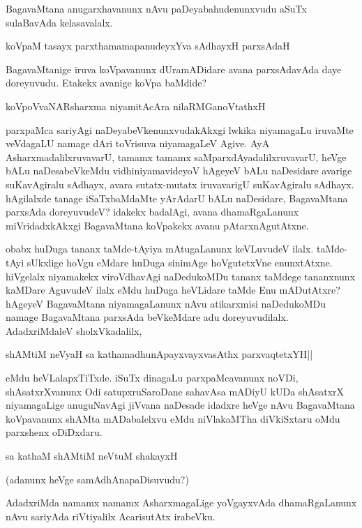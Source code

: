 BagavaMtana anugarxhavanunx nAvu paDeyabahudenunxvudu aSuTx sulaBavAda kelasavalalx.

\begin{shloka}
koVpaM tasayx parxthamamapanudeyxYva sAdhayxH parxsAdaH
\end{shloka}

BagavaMtanige iruva koVpavanunx dUramADidare avana parxsAdavAda daye doreyuvudu. Etakekx avanige koVpa baMdide?

\begin{shloka}
koVpoVvaNARsharxma niyamitAcAra nilaRMGanoVtathxH
\end{shloka}

parxpaMca sariyAgi naDeyabeVkenunxvudakAkxgi lwkika niyamagaLu iruvaMte veVdagaLU namage dAri toVrisuva niyamagaLeV Agive. AyA AsharxmadalilxruvavarU, tamamx tamamx saMparxdAyadalilxruvavarU, heVge bALu naDesabeVkeMdu vidhiniyamavideyoV hAgeyeV bALu naDesidare avarige suKavAgiralu sAdhayx, avara sutatx-mutatx iruvavarigU suKavAgiralu sAdhayx. hAgilalxde tanage iSaTxbaMdaMte yArAdarU bALu naDesidare, BagavaMtana parxsAda doreyuvudeV? idakekx badalAgi, avana dhamaRgaLanunx miVridadxkAkxgi BagavaMtana koVpakekx avanu pAtarxnAgutAtxne.

obabx huDuga tananx taMde-tAyiya mAtugaLanunx keVLuvudeV ilalx. taMde-tAyi sUkxlige hoVgu eMdare huDuga sinimAge hoVgutetxVne enunxtAtxne. hiVgelalx niyamakekx viroVdhavAgi naDedukoMDu tananx taMdege tananxnunx kaMDare AguvudeV ilalx eMdu huDuga heVLidare taMde Enu mADutAtxre? hAgeyeV BagavaMtana niyamagaLanunx nAvu atikarxmisi naDedukoMDu namage BagavaMtana parxsAda beVkeMdare adu doreyuvudilalx. AdadxriMdaleV sholxVkadalilx,

\begin{shloka}
shAMtiM neVyaH sa kathamadhunApayxvayxvasAthx parxvaqtetxYH||
\end{shloka}

eMdu heVLalapxTiTxde. iSuTx dinagaLu parxpaMcavanunx noVDi, shAsatxrXvanunx Odi satupxruSaroDane sahavAsa mADiyU kUDa shAsatxrX niyamagaLige anuguNavAgi jiVvana naDesade idadxre heVge nAvu BagavaMtana koVpavanunx shAMta mADabalelxvu eMdu niVlakaMTha diVkiSxtaru oMdu parxshenx oDiDxdaru.

\begin{shloka}
sa kathaM shAMtiM neVtuM shakayxH
\end{shloka}

(adanunx heVge samAdhAnapaDisuvudu?)

AdadxriMda namamx namamx AsharxmagaLige yoVgayxvAda dhamaRgaLanunx nAvu sariyAda riVtiyalilx AcarisutAtx irabeVku.

